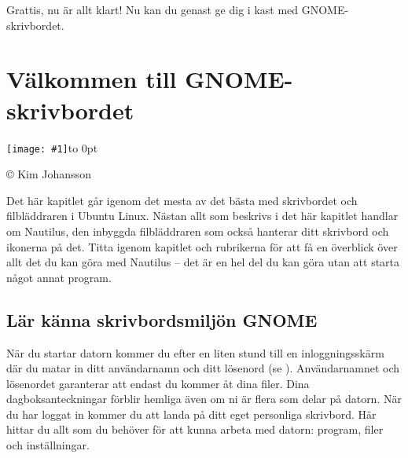 \documentclass[a4paper,final]{memoir} %
\newcommand{\xrcredit}[1]{\hbox to 0pt{\hspace*{.6\baselineskip}\begin{rotate}{90}{\usefont{T1}{phv}{m}{n}\selectfont\tiny #1}\end{rotate}}}
\newcommand\xintropic[1]{{\texttt{[image: \#1]}\xrcredit{\copyright{} Kim Johansson}}\medskip}
\newcommand\xchapter[2]{\chapter{#2}\begin{center}\xintropic{#1}\end{center}}
\begin{document}
Grattis, nu är allt klart! Nu kan du genast ge dig i kast med GNOME-skrivbordet.



\xchapter{bilder804-all/Valkommen_till_gnome}{Välkommen till GNOME-skrivbordet}\label{cha:valkommen}



Det här kapitlet går igenom det mesta av det bästa med skrivbordet och filbläddraren i Ubuntu Linux. Nästan allt som beskrivs i det här kapitlet handlar om Nautilus, den inbyggda filbläddraren som också hanterar ditt skrivbord och ikonerna på det. Titta igenom kapitlet och rubrikerna för att få en överblick över allt det du kan göra med Nautilus -- det är en hel del du kan göra utan att starta något annat program.

\section{Lär känna skrivbordsmiljön GNOME}


När du startar datorn kommer du efter en liten stund till en inloggningsskärm där du matar in ditt användarnamn och ditt lösenord (se ). Användarnamnet och lösenordet garanterar att endast du kommer åt dina filer. Dina dagboksanteckningar förblir hemliga även om ni är flera som delar på datorn. När du har loggat in kommer du att landa på ditt eget personliga skrivbord. Här hittar du allt som du behöver för att kunna arbeta med datorn: program, filer och inställningar.

\end{document}
